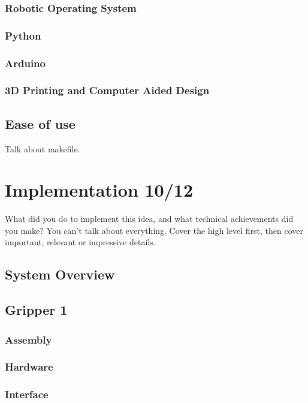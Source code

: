 \documentclass{l4proj}
\begin{document}
\subsection{Robotic Operating System}
\subsection{Python}
\subsection{Arduino} 
\subsection{3D Printing and Computer Aided Design}

\section{Ease of use}
Talk about makefile. 


\chapter{Implementation 10/12}
What did you do to implement this idea, and what technical achievements did you make?
You can't talk about everything. Cover the high level first, then cover important, relevant or impressive details.

\section{System Overview}

\section{Gripper 1}
\subsection{Assembly}
\subsection{Hardware}
\subsection{Interface}
\end{document}
